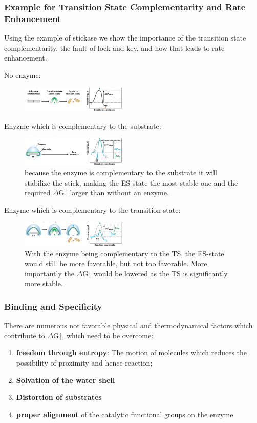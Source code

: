 \documentclass[../main.tex]{subfiles}
\begin{document}
\subsubsection{Example for \gls{Transition State Complementarity} and \gls{Rate Enhancement}}
Using the example of stickase we show the importance of the transition state complementarity, the fault of lock and key, and how that leads to rate enhancement.

No enzyme:
\begin{figure}[h]
	\centering
	\includegraphics[width=0.45\textwidth]{stick_no}
\end{figure}

Enyzme which is complementary to the substrate:
\begin{figure}[h]
	\centering
	\includegraphics[width=0.45\textwidth]{stick_s}
	\caption{because the enzyme is complementary to the substrate it will stabilize the stick, making the ES state the most stable one and the required $\Delta$G$\ddagger$ larger than without an enzyme.}
\end{figure}

Enzyme which is complementary to the transition state:
\begin{figure}[h]
	\centering
	\includegraphics[width=0.45\textwidth]{stick_ts}
	\caption{With the enzyme being complementary to the TS, the ES-state would still be more favorable, but not too favorable. More importantly the $\Delta$G$\ddagger$ would be lowered as the TS is significantly more stable.}
\end{figure}

\subsubsection{\gls{Binding} and \gls{Specificity}}

There are numerous not favorable physical and thermodynamical factors which contribute to $\Delta$G$\ddagger$, which need to be overcome:
\begin{enumerate}
	\item \textbf{freedom through entropy}: The motion of molecules which reduces the possibility of proximity and hence reaction;
	\item \textbf{Solvation of the water shell}
	\item \textbf{Distortion of substrates}
	\item\textbf{ proper alignment} of the catalytic functional groups on the enzyme
\end{enumerate}
\end{document}
